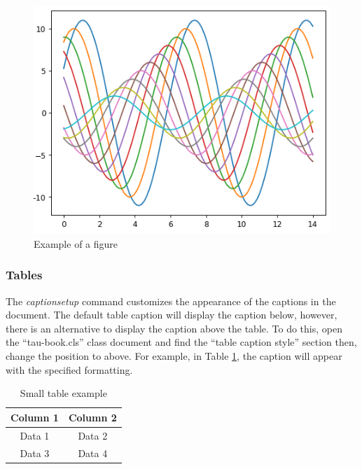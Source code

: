 \documentclass[10pt,a4paper,twoside]{tau-book}
\begin{document}
            \begin{figure}[H]
                \centering
                \includegraphics[width=\columnwidth]{Figures/Lines.png}
                \caption{Example of a figure}
                \label{fig:enter-label}
            \end{figure}

        \subsubsection{Tables}

            The \textit{captionsetup} command customizes the appearance of the captions in the document. The default table caption will display the caption below, however, there is an alternative to display the caption above the table. To do this, open the ``tau-book.cls'' class document and find the ``table caption style'' section then, change the position to above. For example, in Table \ref{tab:example}, the caption will appear with the specified formatting.
        
            \begin{table}[H]
                \centering
                \begin{tabular}{cc}
                    \textbf{Column 1} & \textbf{Column 2} \\
                    \midrule
                    Data 1 & Data 2 \\
                    Data 3 & Data 4 \\
                    \bottomrule
                \end{tabular}
                \caption{Small table example}
                \label{tab:example}
            \end{table}
\end{document}
